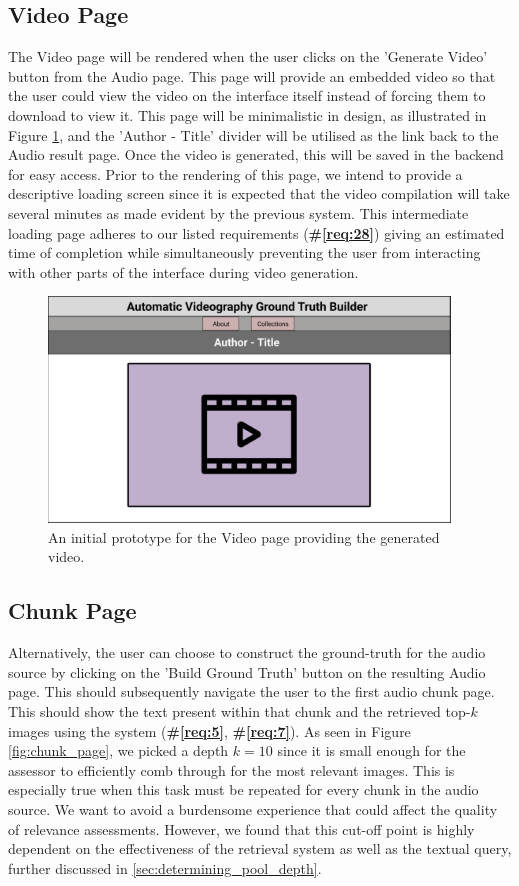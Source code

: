 \documentclass{l4proj}
\begin{document}
\subsection{Video Page}
The Video page will be rendered when the user clicks on the 'Generate Video' button from the Audio page. This page will provide an embedded video so that the user could view the video on the interface itself instead of forcing them to download to view it. This page will be minimalistic in design, as illustrated in Figure \ref{fig:video_page}, and the 'Author - Title' divider will be utilised as the link back to the Audio result page. Once the video is generated, this will be saved in the backend for easy access. Prior to the rendering of this page, we intend to provide a descriptive loading screen since it is expected that the video compilation will take several minutes as made evident by the previous system. This intermediate loading page adheres to our listed requirements (\textbf{\#\ref{req:28}}) giving an estimated time of completion while simultaneously preventing the user from interacting with other parts of the interface during video generation.

\begin{figure}
    \centering
    \includegraphics[width=0.95\textwidth]{figures/video_page.pdf}
    \caption{An initial prototype for the Video page providing the generated video.}
    \label{fig:video_page}
\end{figure}

\subsection{Chunk Page}
Alternatively, the user can choose to construct the ground-truth for the audio source by clicking on the 'Build Ground Truth' button on the resulting Audio page. This should subsequently navigate the user to the first audio chunk page. This should show the text present within that chunk and the retrieved top-$k$ images using the system (\textbf{\#\ref{req:5}}, \textbf{\#\ref{req:7}}). As seen in Figure \ref{fig:chunk_page}, we picked a depth $k=10$ since it is small enough for the assessor to efficiently comb through for the most relevant images. This is especially true when this task must be repeated for every chunk in the audio source. We want to avoid a burdensome experience that could affect the quality of relevance assessments. However, we found that this cut-off point is highly dependent on the effectiveness of the retrieval system as well as the textual query, further discussed in \ref{sec:determining_pool_depth}.
\end{document}
